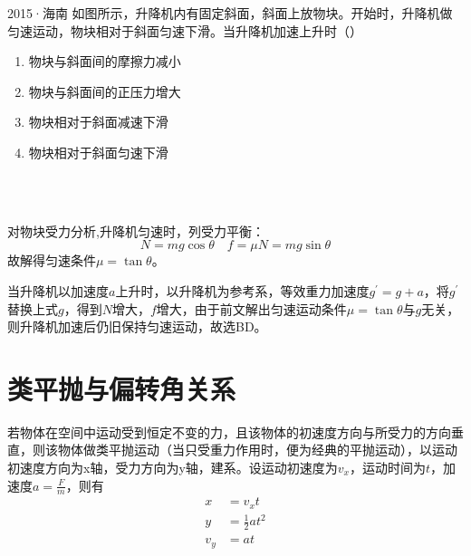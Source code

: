 \begin{ep}{2015·海南}{}
如图所示，升降机内有固定斜面，斜面上放物块。开始时，升降机做匀速运动，物块相对于斜面匀速下滑。当升降机加速上升时（）

\begin{minipage}[b]{0.6\linewidth}
\begin{enumerate}[label=(\Alph*)]
  \item 物块与斜面间的摩擦力减小
  \item 物块与斜面间的正压力增大
  \item 物块相对于斜面减速下滑
  \item 物块相对于斜面匀速下滑
\end{enumerate}
\end{minipage}
\hfill
\begin{minipage}[b]{0.3\linewidth}

\end{minipage}
~\\

\begin{minipage}[b]{0.6\linewidth}
~\\

对物块受力分析,升降机匀速时，列受力平衡：
$$N = mg \cos{\theta} \quad f=\mu N = mg \sin{\theta}$$
故解得匀速条件$\mu = \tan{\theta}$。

当升降机以加速度$a$上升时，以升降机为参考系，等效重力加速度$g^{\prime}=g+a$，将$g^{\prime}$替换上式$g$，得到$N$增大，$f$增大，由于前文解出匀速运动条件$\mu = \tan{\theta}$与$g$无关，则升降机加速后仍旧保持匀速运动，故选BD。

\end{minipage}
\hfill
\begin{minipage}[b]{0.3\linewidth}

\end{minipage}

\end{ep}
\section{类平抛与偏转角关系}

若物体在空间中运动受到恒定不变的力，且该物体的初速度方向与所受力的方向垂直，则该物体做类平抛运动（当只受重力作用时，便为经典的平抛运动），以运动初速度方向为x轴，受力方向为y轴，建系。设运动初速度为$v_x$，运动时间为$t$，加速度$a = \frac{F}{m}$，则有
\begin{subequations}
\label{e_lpp1}
\begin{align}
x &= v_x t \\
y &= \frac{1}{2} a t^2 \\
v_y &= a t
\end{align}
\end{subequations}

